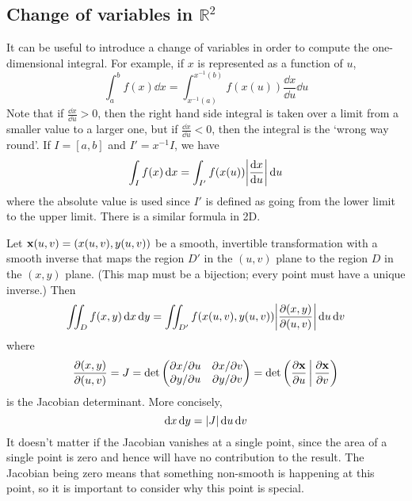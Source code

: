 \subsection{Change of variables in \(\mathbb R^2\)}
It can be useful to introduce a change of variables in order to compute the one-dimensional integral.
For example, if \(x\) is represented as a function of \(u\),
\[
	\int_a^b f(x) \dd{x} = \int_{x^{-1}(a)}^{x^{-1}(b)} f(x(u)) \frac{\dd{x}}{\dd{u}}\dd{u}
\]
Note that if \(\frac{\dd{x}}{\dd{u}} > 0\), then the right hand side integral is taken over a limit from a smaller value to a larger one, but if \(\frac{\dd{x}}{\dd{u}} < 0\), then the integral is the `wrong way round'.
If \(I = [a,b]\) and \(I' = x^{-1} I\), we have
\[
	\int_I f(x) \dd{x} = \int_{I'} f(x(u)) \abs{\frac{\dd{x}}{\dd{u}}} \dd{u}
\]
where the absolute value is used since \(I'\) is defined as going from the lower limit to the upper limit.
There is a similar formula in 2D.
\begin{proposition}
	Let \(\vb x(u, v) = (x(u, v), y(u, v))\) be a smooth, invertible transformation with a smooth inverse that maps the region \(D'\) in the \((u, v)\) plane to the region \(D\) in the \((x, y)\) plane.
	(This map must be a bijection; every point must have a unique inverse.) Then
	\[
		\iint_D f(x, y) \dd{x} \dd{y} = \iint_{D'} f(x(u, v), y(u, v)) \abs{\frac{\partial (x, y)}{\partial (u, v)}}\dd{u} \dd{v}
	\]
	where
	\[
		\frac{\partial (x, y)}{\partial (u, v)} = J = \det \begin{pmatrix}
			\partial x / \partial u & \partial x / \partial v \\
			\partial y / \partial u & \partial y / \partial v
		\end{pmatrix} = \det \left( \frac{\partial \vb x}{\partial u} \,\middle|\, \frac{\partial \vb x}{\partial v} \right)
	\]
	is the Jacobian determinant.
	More concisely,
	\[
		\dd{x} \dd{y} = \abs{J} \dd{u} \dd{v}
	\]
	It doesn't matter if the Jacobian vanishes at a single point, since the area of a single point is zero and hence will have no contribution to the result.
	The Jacobian being zero means that something non-smooth is happening at this point, so it is important to consider why this point is special.
\end{proposition}
